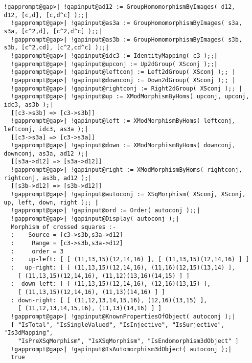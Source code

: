\documentclass[a4paper,11pt]{report}
\begin{document}
{{\begin{Verbatim}[commandchars=!@|,fontsize=\small,frame=single,label=Example]
  !gapprompt@gap>| !gapinput@ad12 := GroupHomomorphismByImages( d12, d12, [c,d], [c,d^c] );;|
  !gapprompt@gap>| !gapinput@as3a := GroupHomomorphismByImages( s3a, s3a, [c^2,d], [c^2,d^c] );;|
  !gapprompt@gap>| !gapinput@as3b := GroupHomomorphismByImages( s3b, s3b, [c^2,cd], [c^2,cd^c] );;|
  !gapprompt@gap>| !gapinput@idc3 := IdentityMapping( c3 );;|
  !gapprompt@gap>| !gapinput@upconj := Up2dGroup( XSconj );;|
  !gapprompt@gap>| !gapinput@leftconj := Left2dGroup( XSconj );; |
  !gapprompt@gap>| !gapinput@downconj := Down2dGroup( XSconj );; |
  !gapprompt@gap>| !gapinput@rightconj := Right2dGroup( XSconj );; |
  !gapprompt@gap>| !gapinput@up := XModMorphismByHoms( upconj, upconj, idc3, as3b );|
  [[c3->s3b] => [c3->s3b]]
  !gapprompt@gap>| !gapinput@left := XModMorphismByHoms( leftconj, leftconj, idc3, as3a );|
  [[c3->s3a] => [c3->s3a]]
  !gapprompt@gap>| !gapinput@down := XModMorphismByHoms( downconj, downconj, as3a, ad12 );|
  [[s3a->d12] => [s3a->d12]]
  !gapprompt@gap>| !gapinput@right := XModMorphismByHoms( rightconj, rightconj, as3b, ad12 );|
  [[s3b->d12] => [s3b->d12]]
  !gapprompt@gap>| !gapinput@autoconj := XSqMorphism( XSconj, XSconj, up, left, down, right );; |
  !gapprompt@gap>| !gapinput@ord := Order( autoconj );;|
  !gapprompt@gap>| !gapinput@Display( autoconj );|
  Morphism of crossed squares :-
  :    Source = [c3->s3b,s3a->d12]
  :     Range = [c3->s3b,s3a->d12]
  :     order = 3
  :    up-left: [ [ (11,13,15)(12,14,16) ], [ (11,13,15)(12,14,16) ] ]
  :   up-right: [ [ (11,13,15)(12,14,16), (11,16)(12,15)(13,14) ],
    [ (11,13,15)(12,14,16), (11,12)(13,16)(14,15) ] ]
  :  down-left: [ [ (11,13,15)(12,14,16), (12,16)(13,15) ],
    [ (11,13,15)(12,14,16), (11,13)(14,16) ] ]
  : down-right: [ [ (11,12,13,14,15,16), (12,16)(13,15) ],
    [ (11,12,13,14,15,16), (11,13)(14,16) ] ]
  !gapprompt@gap>| !gapinput@KnownPropertiesOfObject( autoconj );|
  [ "IsTotal", "IsSingleValued", "IsInjective", "IsSurjective", "Is3dMapping",
    "IsPreXSqMorphism", "IsXSqMorphism", "IsEndomorphism3dObject" ]
  !gapprompt@gap>| !gapinput@IsAutomorphism3dObject( autoconj );|
  true
  
\end{Verbatim}
 }

 }

            
\end{document}
